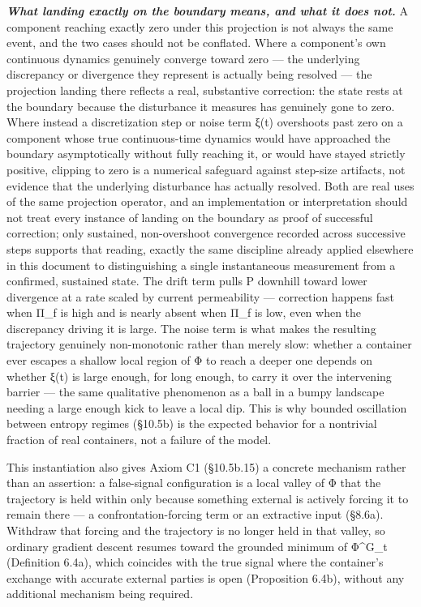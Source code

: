 \documentclass[
]{article}
\begin{document}
\emph{\textbf{What landing exactly on the boundary means, and what it
does not.}} A component reaching exactly zero under this projection is
not always the same event, and the two cases should not be conflated.
Where a component's own continuous dynamics genuinely converge toward
zero --- the underlying discrepancy or divergence they represent is
actually being resolved --- the projection landing there reflects a
real, substantive correction: the state rests at the boundary because
the disturbance it measures has genuinely gone to zero. Where instead a
discretization step or noise term ξ(t) overshoots past zero on a
component whose true continuous-time dynamics would have approached the
boundary asymptotically without fully reaching it, or would have stayed
strictly positive, clipping to zero is a numerical safeguard against
step-size artifacts, not evidence that the underlying disturbance has
actually resolved. Both are real uses of the same projection operator,
and an implementation or interpretation should not treat every instance
of landing on the boundary as proof of successful correction; only
sustained, non-overshoot convergence recorded across successive steps
supports that reading, exactly the same discipline already applied
elsewhere in this document to distinguishing a single instantaneous
measurement from a confirmed, sustained state. The drift term pulls P
downhill toward lower divergence at a rate scaled by current
permeability --- correction happens fast when Π\_f is high and is nearly
absent when Π\_f is low, even when the discrepancy driving it is large.
The noise term is what makes the resulting trajectory genuinely
non-monotonic rather than merely slow: whether a container ever escapes
a shallow local region of Φ to reach a deeper one depends on whether
ξ(t) is large enough, for long enough, to carry it over the intervening
barrier --- the same qualitative phenomenon as a ball in a bumpy
landscape needing a large enough kick to leave a local dip. This is why
bounded oscillation between entropy regimes (§10.5b) is the expected
behavior for a nontrivial fraction of real containers, not a failure of
the model.

This instantiation also gives Axiom C1 (§10.5b.15) a concrete mechanism
rather than an assertion: a false-signal configuration is a local valley
of Φ that the trajectory is held within only because something external
is actively forcing it to remain there --- a confrontation-forcing term
or an extractive input (§8.6a). Withdraw that forcing and the trajectory
is no longer held in that valley, so ordinary gradient descent resumes
toward the grounded minimum of Φ\^{}G\_t (Definition 6.4a), which
coincides with the true signal where the container's exchange with
accurate external parties is open (Proposition 6.4b), without any
additional mechanism being required.
\end{document}
